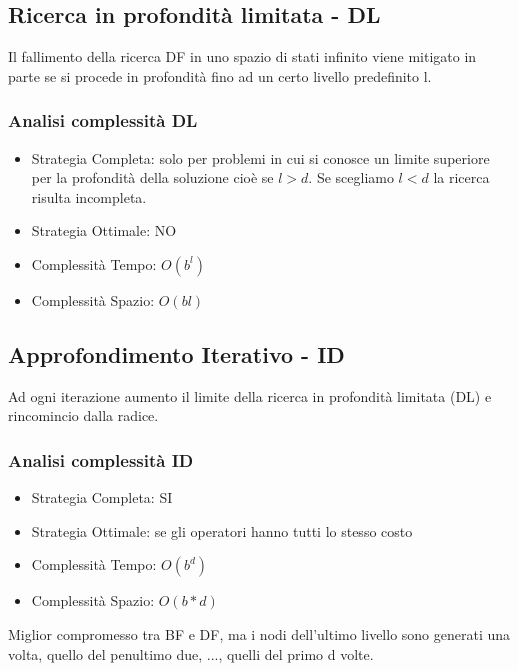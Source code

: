 \documentclass{article}
\begin{document}
\subsection{Ricerca in profondità limitata - DL}
Il fallimento della ricerca DF in uno spazio di stati infinito viene mitigato in parte se si procede in profondità fino ad un certo livello predefinito l.
\subsubsection{Analisi complessità DL}
\begin{itemize}
    \item Strategia Completa: solo per problemi in cui si conosce un limite superiore per la profondità della soluzione cioè se $l>d$. Se scegliamo $l < d$ la ricerca risulta incompleta.
    \item Strategia Ottimale: NO
    \item Complessità Tempo: $O(b^l)$
    \item Complessità Spazio: $O(bl)$
\end{itemize}

\subsection{Approfondimento Iterativo - ID}
Ad ogni iterazione aumento il limite della ricerca in profondità limitata (DL) e rincomincio dalla radice.
\subsubsection{Analisi complessità ID}
\begin{itemize}
    \item Strategia Completa: SI
    \item Strategia Ottimale: se gli operatori hanno tutti lo stesso costo
    \item Complessità Tempo: $O(b^d)$
    \item Complessità Spazio: $O(b*d)$
\end{itemize}
Miglior compromesso tra BF e DF, ma i nodi dell'ultimo livello sono generati una volta, quello del penultimo due, ..., quelli del primo d volte.
\end{document}
